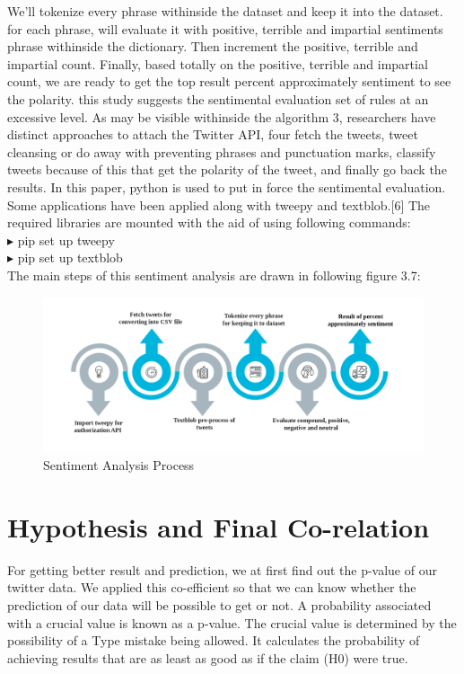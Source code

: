 We’ll tokenize every phrase withinside the dataset and keep it into the dataset. for each phrase, will evaluate it with positive, terrible and impartial sentiments phrase withinside the dictionary. Then increment the positive, terrible and impartial count. Finally, based totally on the positive, terrible and impartial count, we are ready to get the top result percent approximately sentiment to see the polarity. this study suggests the sentimental evaluation set of rules at an excessive level. As may be visible withinside the algorithm 3, researchers have distinct approaches to attach the Twitter API, four fetch the tweets, tweet cleansing or do away with preventing phrases and punctuation marks, classify tweets because of this that get the polarity of the tweet, and finally go back the results. In this paper, python is used to put in force the sentimental evaluation. Some applications have been applied along with tweepy and textblob.[6] \cite{mittal2012stock} The required 
libraries are mounted with the aid of using following commands:\\
$\blacktriangleright$ pip set up tweepy\\$\blacktriangleright$ pip set up textblob\\

The main steps of this sentiment analysis are drawn in following figure 3.7:\\

\begin{figure}[H]
    \centering
    \includegraphics[scale=.3]{img3/Sentiment Analysis Process.png}
    \caption{Sentiment Analysis Process}
    \label{fig:Sentiment Analysis}
\end{figure}


\section{Hypothesis and Final Co-relation}
For getting better result and prediction, we at first find out the p-value of our twitter data. We applied this co-efficient so that we can know whether the prediction of our data will be possible to get or not. A probability associated with a crucial value is known as a p-value. The crucial value is determined by the possibility of a Type mistake being allowed. It calculates the probability of achieving results that are as least as good as if the claim (H0) were true.\\

